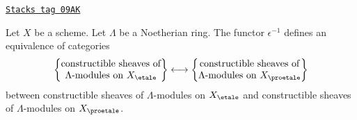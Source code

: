 \begin{lemma}
\label{proetale-lemma-compare-constructible}
\href{https://stacks.math.columbia.edu/tag/09AK}{\texttt{Stacks tag 09AK}}

Let $X$ be a scheme. Let $\Lambda$ be a Noetherian ring.
The functor $\epsilon^{-1}$ defines an equivalence of categories
$$
\left\{
\begin{matrix}
\text{constructible sheaves of}\\
\Lambda\text{-modules on }X_\etale\\
\end{matrix}
\right\}
\longleftrightarrow
\left\{
\begin{matrix}
\text{constructible sheaves of}\\
\Lambda\text{-modules on }X_\proetale\\
\end{matrix}
\right\}
$$
between constructible sheaves of $\Lambda$-modules on $X_\etale$
and constructible sheaves of $\Lambda$-modules on $X_\proetale$.
\end{lemma}

